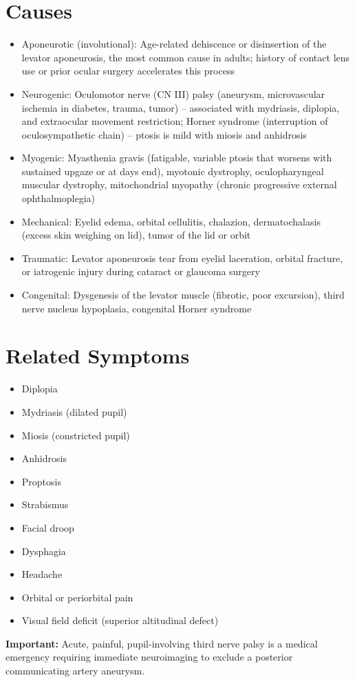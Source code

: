 \section*{Causes}
\begin{itemize}
  \item Aponeurotic (involutional): Age-related dehiscence or disinsertion of the levator aponeurosis, the most common cause in adults; history of contact lens use or prior ocular surgery accelerates this process
  \item Neurogenic: Oculomotor nerve (CN III) palsy (aneurysm, microvascular ischemia in diabetes, trauma, tumor) -- associated with mydriasis, diplopia, and extraocular movement restriction; Horner syndrome (interruption of oculosympathetic chain) -- ptosis is mild with miosis and anhidrosis
  \item Myogenic: Myasthenia gravis (fatigable, variable ptosis that worsens with sustained upgaze or at days end), myotonic dystrophy, oculopharyngeal muscular dystrophy, mitochondrial myopathy (chronic progressive external ophthalmoplegia)
  \item Mechanical: Eyelid edema, orbital cellulitis, chalazion, dermatochalasis (excess skin weighing on lid), tumor of the lid or orbit
  \item Traumatic: Levator aponeurosis tear from eyelid laceration, orbital fracture, or iatrogenic injury during cataract or glaucoma surgery
  \item Congenital: Dysgenesis of the levator muscle (fibrotic, poor excursion), third nerve nucleus hypoplasia, congenital Horner syndrome
\end{itemize}

\section*{Related Symptoms}
\begin{itemize}
  \item Diplopia
  \item Mydriasis (dilated pupil)
  \item Miosis (constricted pupil)
  \item Anhidrosis
  \item Proptosis
  \item Strabismus
  \item Facial droop
  \item Dysphagia
  \item Headache
  \item Orbital or periorbital pain
  \item Visual field deficit (superior altitudinal defect)
\end{itemize}
\textbf{Important:} Acute, painful, pupil-involving third nerve palsy is a medical emergency requiring immediate neuroimaging to exclude a posterior communicating artery aneurysm.

